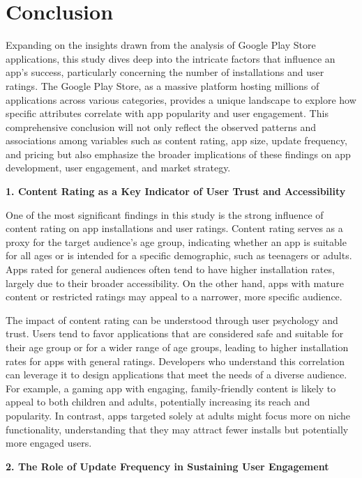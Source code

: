 \documentclass[
]{article}
\begin{document}
\section{\texorpdfstring{\textbf{Conclusion}}{Conclusion}}\label{conclusion}

Expanding on the insights drawn from the analysis of Google Play Store
applications, this study dives deep into the intricate factors that
influence an app's success, particularly concerning the number of
installations and user ratings. The Google Play Store, as a massive
platform hosting millions of applications across various categories,
provides a unique landscape to explore how specific attributes correlate
with app popularity and user engagement. This comprehensive conclusion
will not only reflect the observed patterns and associations among
variables such as content rating, app size, update frequency, and
pricing but also emphasize the broader implications of these findings on
app development, user engagement, and market strategy.

\textbf{1. Content Rating as a Key Indicator of User Trust and
Accessibility}

One of the most significant findings in this study is the strong
influence of content rating on app installations and user ratings.
Content rating serves as a proxy for the target audience's age group,
indicating whether an app is suitable for all ages or is intended for a
specific demographic, such as teenagers or adults. Apps rated for
general audiences often tend to have higher installation rates, largely
due to their broader accessibility. On the other hand, apps with mature
content or restricted ratings may appeal to a narrower, more specific
audience.

The impact of content rating can be understood through user psychology
and trust. Users tend to favor applications that are considered safe and
suitable for their age group or for a wider range of age groups, leading
to higher installation rates for apps with general ratings. Developers
who understand this correlation can leverage it to design applications
that meet the needs of a diverse audience. For example, a gaming app
with engaging, family-friendly content is likely to appeal to both
children and adults, potentially increasing its reach and popularity. In
contrast, apps targeted solely at adults might focus more on niche
functionality, understanding that they may attract fewer installs but
potentially more engaged users.

\textbf{2. The Role of Update Frequency in Sustaining User Engagement}
\end{document}
